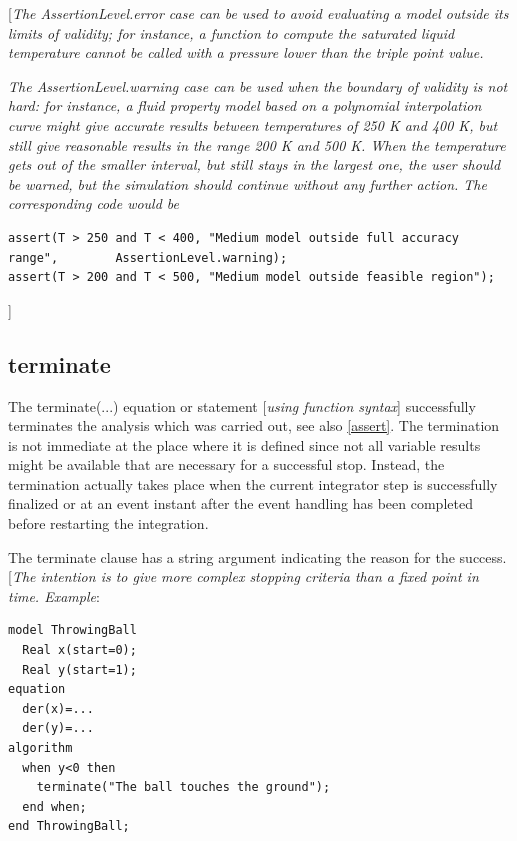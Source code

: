 \documentclass[10pt,a4paper]{report}
\def\doublelabel#1{\label{#1}}
\begin{document}
{[}\emph{The AssertionLevel.error case can be used to avoid evaluating a
model outside its limits of validity; for instance, a function to
compute the saturated liquid temperature cannot be called with a
pressure lower than the triple point value.}

\emph{The AssertionLevel.warning case can be used when the boundary of
validity is not hard: for instance, a fluid property model based on a
polynomial interpolation curve might give accurate results between
temperatures of 250 K and 400 K, but still give reasonable results in
the range 200 K and 500 K. When the temperature gets out of the smaller
interval, but still stays in the largest one, the user should be warned,
but the simulation should continue without any further action. The
corresponding code would be}

\begin{lstlisting}[language=modelica]
assert(T > 250 and T < 400, "Medium model outside full accuracy range",        AssertionLevel.warning); 
assert(T > 200 and T < 500, "Medium model outside feasible region"); 
\end{lstlisting}
{]}

\subsection{terminate}\doublelabel{terminate}

The terminate(...) equation or statement {[}\emph{using function
syntax}{]} successfully terminates the analysis which was carried out,
see also \ref{assert}. The termination is not immediate at the place
where it is defined since not all variable results might be available
that are necessary for a successful stop. Instead, the termination
actually takes place when the current integrator step is successfully
finalized or at an event instant after the event handling has been
completed before restarting the integration.

The terminate clause has a string argument indicating the reason for the
success. {[}\emph{The intention is to give more complex stopping
criteria than a fixed point in time. Example}:

\begin{lstlisting}[language=modelica]
model ThrowingBall  
  Real x(start=0);
  Real y(start=1);
equation
  der(x)=...
  der(y)=...
algorithm
  when y<0 then
    terminate("The ball touches the ground");
  end when;
end ThrowingBall;
\end{lstlisting}
\end{document}
